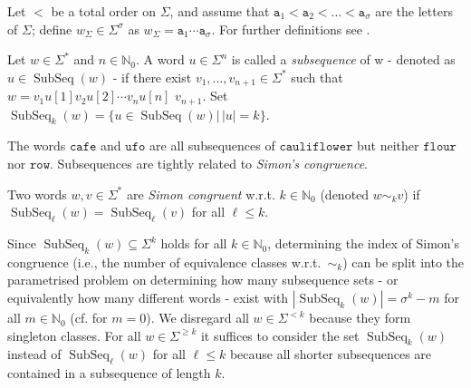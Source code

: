 \documentclass[runningheads,UKenglish,cleveref, autoref, thm-restate]{llncs}
\newcommand{\N}{\mathbb{N}}
\def\ta{\mathtt{a}}
\DeclareMathOperator\ScatFact{SubSeq}
\DeclareMathOperator{\cond}{cond}
\begin{document}
Let $<$ be a total order on $\Sigma$, and assume that $\ta_1<\ta_2<\ldots < \ta_\sigma$ are the letters of $\Sigma$; define $w_{\Sigma} \in \Sigma^{\sigma}$ as $w_{\Sigma}=\ta_1\cdots\ta_{\sigma}$.
For further definitions see \cite{lothaire}. %

\begin{definition}
	Let $w \in \Sigma^*$ and $n \in \mathbb{N}_0$. A word $u \in \Sigma^n$ is called a \emph{subsequence} of w - denoted as $u \in \ScatFact(w)$ - if there exist $v_1,\dots, v_{n+1} \in \Sigma^*$ such that $w = v_1 u[1] v_2 u[2] \cdots v_n u[n]$ $v_{n+1}$.
	Set $\ScatFact_k(w)=\{u\in\ScatFact(w)|\,|u|=k\}$.
\end{definition}

The words $\mathtt{cafe}$ and $\mathtt{ufo}$ are all subsequences of $\mathtt{cauliflower}$ but neither $\mathtt{flour}$ nor $\mathtt{row}$. Subsequences are tightly related to {\em Simon's congruence}. 

\begin{definition}
	Two words $w,v \in \Sigma^*$ are \emph{Simon congruent} w.r.t. $k\in\N_0$ (denoted $w \sim_k v$) if $\operatorname{\ScatFact}_{\ell}(w) = \operatorname{\ScatFact}_{\ell}(v)$ for all $\ell\leq k$. 
\end{definition}

Since $\ScatFact_k(w)\subseteq\Sigma^k$ holds for all $k\in\N_0$, determining the index of Simon's
congruence (i.e., the number of equivalence classes w.r.t.~$\sim_k$) can be split into the parametrised problem on determining how many subsequence sets 
- or equivalently how many different words - exist with $|\ScatFact_k(w)|=\sigma^k-m$ for all 
$m\in\N_0$ (cf. \cite{DBLP:conf/dlt/BarkerFHMN20,DBLP:conf/stacs/DayFKKMS21} for $m=0$).
We disregard all \(w \in \Sigma^{<k}\) because they form singleton classes. For all \(w\in\Sigma^{\geq k}\) it suffices to consider the set \(\ScatFact_k(w)\) instead of $\ScatFact_{\ell}(w)$ for all $\ell \leq k$ because all shorter subsequences are contained in a subsequence of length \(k\).
\end{document}
